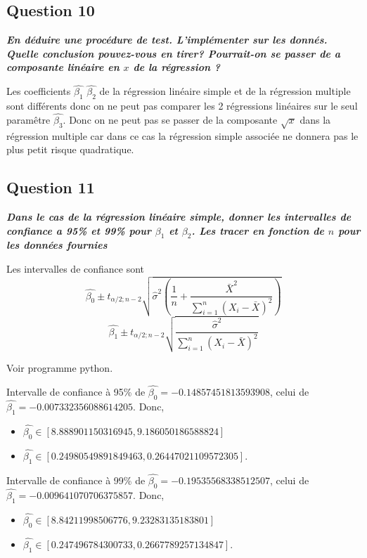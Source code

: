 \documentclass[pdflatex]{article}
\theoremstyle{definition}
\newcommand{\quest}[1]{\textbf{\textit{#1}} \vspace{3mm}}
\begin{document}
\subsection*{Question 10}
\quest{En d\'eduire une proc\'edure de test. L'impl\'ementer sur les donn\'es. Quelle conclusion pouvez-vous en tirer? Pourrait-on se passer de a composante lin\'eaire en $x$ de la r\'egression ?}


Les coefficients $\hat{\beta_1}$ $\hat{\beta_2}$ de la r\'egression lin\'eaire simple et de la r\'egression multiple sont diff\'erents donc on ne peut pas comparer les 2 r\'egressions lin\'eaires sur le seul param\^etre $\hat{\beta_3}$. Donc on ne peut pas se passer de la composante $\sqrt{x}$ dans la r\'egression multiple car dans ce cas la r\'egression simple associ\'ee ne donnera pas le plus petit risque quadratique.


\subsection*{Question 11}
\quest{Dans le cas de la r\'egression lin\'eaire simple, donner les intervalles de confiance a 95\% et 99\% pour $\beta_1$ et $\beta_2$. Les tracer en fonction de $n$ pour les donn\'ees fournies}

Les intervalles de confiance sont 
$$
\hat{\beta_0} \pm t_{\alpha/2;n-2}\sqrt{\hat{\sigma}^2\left(\frac{1}{n}+\frac{\bar{X}^2}{\sum_{i=1}^{n}{(X_i-\bar{X})^2}}\right)}
$$
$$
\hat{\beta_1} \pm t_{\alpha/2;n-2}\sqrt{\frac{\hat{\sigma}^2}{\sum_{i=1}^{n}{(X_i-\bar{X})^2}}}
$$

Voir programme python.

Intervalle de confiance \`a 95\% de $\hat{\beta_0} = -0.14857451813593908$, celui de $\hat{\beta_1} = -0.007332356088614205$. Donc, 
\begin{itemize}
    \item $ \hat{\beta_0} \in [8.888901150316945, 9.186050186588824]$ 
    \item $\hat{\beta_1} \in [0.24980549891849463, 0.26447021109572305]$.
\end{itemize}

\vspace{5mm}
Intervalle de confiance \`a 99\% de $\hat{\beta_0} = -0.19535568338512507$, celui de $\hat{\beta_1} = -0.009641070706375857$. Donc,
\begin{itemize}
    \item $\hat{\beta_0} \in [8.84211998506776, 9.23283135183801]$
    \item $\hat{\beta_1} \in [0.247496784300733, 0.2667789257134847]$.
\end{itemize}
\end{document}
